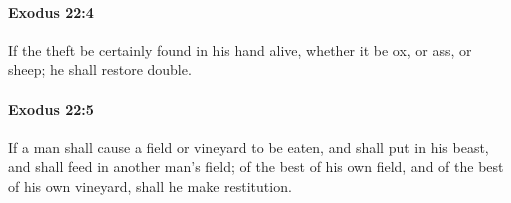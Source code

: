 		\paragraph{Exodus 22:4} %
			\label{EXODUS-22-4}

			If the theft be certainly found in his hand alive, whether it be ox, or ass, or sheep; he shall restore double.


		\paragraph{Exodus 22:5} %
			\label{EXODUS-22-5}

			If a man shall cause a field or vineyard to be eaten, and shall put in his beast, and shall feed in another man's field; of the best of his own field, and of the best of his own vineyard, shall he make restitution.


